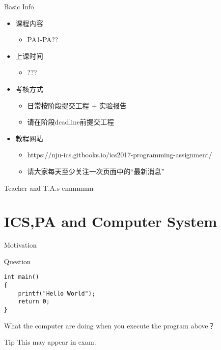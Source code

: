 \documentclass[handout]{beamer}
\title{\titletext}
\subtitle{Introduction}
\author{Xie}
\institute{xiemhemail@gmail.com}
\date{Sep ??, 2017}
\begin{document}
	\maketitle
	
\begin{frame}{Basic Info}
	\begin{itemize}
		\item 课程内容
		\begin{itemize}
			\item PA1-PA??
		\end{itemize}
		\item 上课时间
		\begin{itemize}
			\item ???
		\end{itemize}
		\item 考核方式
			\begin{itemize}
				\item 日常按阶段提交工程 + 实验报告
				\item 请在阶段deadline前提交工程
			\end{itemize}
		\item \alert{教程网站}
		\begin{itemize}
			\item https://nju-ics.gitbooks.io/ics2017-programming-assignment/
			\item \huge 请大家每天至少关注一次页面中的“最新消息”
		\end{itemize}
	\end{itemize}
\end{frame}

\begin{frame}{Teacher and T.A.s}
	emmmmm
\end{frame}

\section{ICS,PA and Computer System}

\begin{frame}
\end{frame}

\begin{frame}[fragile]{Motivation}
\begin{exampleblock}{Question}
\begin{verbatim}
int main()
{
    printf("Hello World");
    return 0;
}
\end{verbatim}
What the computer are doing when you execute the program above？
\end{exampleblock}

\begin{alertblock}{Tip}
	This may appear in exam.
\end{alertblock}

\end{frame}
\end{document}
